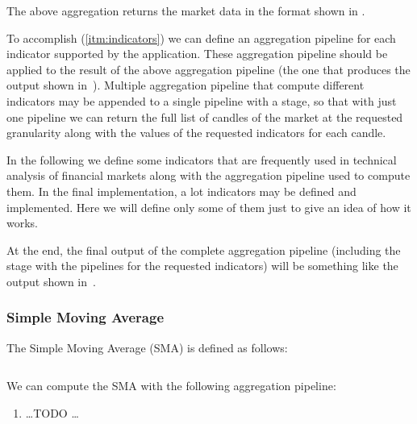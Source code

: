 The above aggregation returns the market data in the format shown in
.



To accomplish (\ref{itm:indicators}) we can define an aggregation pipeline for
each indicator supported by the application. These aggregation pipeline should
be applied to the result of the above aggregation pipeline (the one that
produces the output shown in~). Multiple
aggregation pipeline that compute different indicators may be appended to a
single pipeline with a  stage, so that with just one pipeline we
can return the full list of candles of the market at the requested granularity
along with the values of the requested indicators for each candle.

In the following we define some indicators that are frequently used in technical
analysis of financial markets along with the aggregation pipeline used to
compute them. In the final implementation, a lot indicators may be defined and
implemented. Here we will define only some of them just to give an idea of how
it works.

At the end, the final output of the complete aggregation pipeline (including the
 stage with the pipelines for the requested indicators) will be
something like the output shown in~.



\subsubsection{Simple Moving Average}

The Simple Moving Average (SMA) is defined as follows:

\begin{equation}\label{eq:sma}
\end{equation}

We can compute the SMA with the following aggregation pipeline:

\begin{enumerate}
	\item \ldots TODO \ldots
\end{enumerate}

